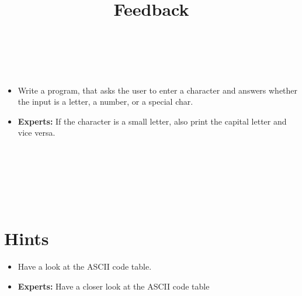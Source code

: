 


\title{Feedback} %
\author{} %
\renewcommand{\difficulty}{Hard} %
\renewcommand{\requirements}{Variables, input/output, conditions, ASCII} %
\renewcommand{\aims}{Make decisions during run time, get to know ASCII more} %


 \maketitle
 \taskinfos

\ \\\ \\
\begin{itemize}
	\item Write a program, that asks the user to enter a character and answers whether the input is a letter, a number, or a special char.
		\item \textbf{Experts:} If the character is a small letter, also print the capital letter and vice versa.
\end{itemize}	
 
 
\ \\\ \\\ \\\ \\\ \\
\section*{Hints}
	\begin{itemize}
		\item Have a look at the ASCII code table.
		\item \textbf{Experts:} Have a closer look at the ASCII code table
	\end{itemize}
 

